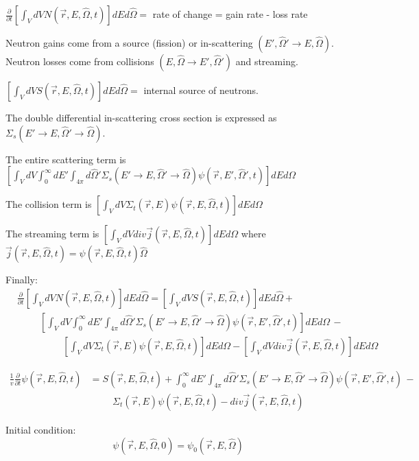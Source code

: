 \documentclass[12pt]{article}
\newcommand{\rvec}{\ensuremath{\vec{r}}}
\newcommand{\omvec}{\ensuremath{\hat{\Omega}}}
\begin{document}
$\frac{\partial}{\partial t}\left[\int_V dV N(\rvec, E, \omvec, t)\right] dEd\omvec =$ rate of change  = gain rate - loss rate

Neutron gains come from a source (fission) or in-scattering $(E', \omvec' \rightarrow E, \omvec)$. Neutron losses come from collisions $(E, \omvec \rightarrow E', \omvec')$ and streaming.

$\left[\int_V dV S(\rvec, E, \omvec, t)\right] dEd\omvec =$ internal source of neutrons.

The double differential in-scattering cross section is expressed as $\Sigma_s(E'\rightarrow E, \omvec'\rightarrow\omvec)$.

The entire scattering term is
$\left[\int_VdV\int_0^{\infty}dE'\int_{4\pi}d\omvec'\Sigma_s(E'\rightarrow E,\omvec'\rightarrow\omvec)\psi(\rvec,E',\omvec',t)\right]dEd\Omega$

The collision term is
$\left[\int_VdV\Sigma_{t}(\rvec,E)\psi(\rvec,E,\omvec,t)\right]dEd\Omega$

The streaming term is
$\left[\int_VdV div \vec{j}(\rvec, E, \omvec,t)\right]dEd\Omega$ where $\vec{j}(\rvec,E,\omvec,t)=\psi(\rvec,E,\omvec,t)\omvec$

Finally:
\begin{align*}
&\frac{\partial}{\partial t}\left[\int_V dV N(\rvec, E, \omvec, t)\right] dEd\omvec =
\left[\int_V dV S(\rvec, E, \omvec, t)\right] dEd\omvec +
\\& \hspace{1cm} \left[\int_VdV\int_0^{\infty}dE'\int_{4\pi}d\omvec'\Sigma_s(E'\rightarrow E,\omvec'\rightarrow\omvec)\psi(\rvec,E',\omvec',t)\right]dEd\Omega \,-
\\& \hspace{2cm}\left[\int_VdV\Sigma_{t}(\rvec,E)\psi(\rvec,E,\omvec,t)\right]dEd\Omega - \left[\int_VdV div \vec{j}(\rvec, E, \omvec,t)\right]dEd\Omega
\end{align*}

\begin{align*}
\frac{1}{v}\frac{\partial}{\partial t}\psi(\rvec, E, \omvec, t) &=
 S(\rvec, E, \omvec, t) +
 \int_0^{\infty}dE'\int_{4\pi}d\omvec'\Sigma_s(E'\rightarrow E,\omvec'\rightarrow\omvec)\psi(\rvec,E',\omvec',t) \,-
\\& \hspace{1cm}\Sigma_{t}(\rvec,E)\psi(\rvec,E,\omvec,t) - div \vec{j}(\rvec, E, \omvec,t)
\end{align*}

Initial condition:
\[
\psi(\rvec, E, \omvec, 0) = \psi_0(\rvec, E,\omvec)
\]
\end{document}

